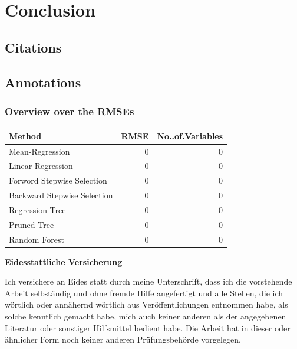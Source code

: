 \documentclass[11pt,]{article}
\begin{document}
\hypertarget{conclusion}{%
\section{Conclusion}\label{conclusion}}

\pagebreak

\hypertarget{citations}{%
\subsection{Citations}\label{citations}}

\pagebreak

\hypertarget{annotations}{%
\subsection{Annotations}\label{annotations}}

\hypertarget{overview-over-the-rmses}{%
\subsubsection{Overview over the RMSEs}\label{overview-over-the-rmses}}

\begin{tabular}{l|r|r}
\hline
Method & RMSE & No..of.Variables\\
\hline
Mean-Regression & 0 & 0\\
\hline
Linear Regression & 0 & 0\\
\hline
Forword Stepwise Selection & 0 & 0\\
\hline
Backward Stepwise Selection & 0 & 0\\
\hline
Regression Tree & 0 & 0\\
\hline
Pruned Tree & 0 & 0\\
\hline
Random Forest & 0 & 0\\
\hline
\end{tabular}
\renewcommand*{\mkbibnamefamily}[1]{\textbf{#1}}
\renewcommand*{\mkbibnamegiven}[1]{\textbf{#1}}
\renewcommand*{\mkbibnameprefix}[1]{\textbf{#1}}
\renewcommand*{\mkbibnamesuffix}[1]{\textbf{#1}}
\printbibliography[title=References]

\newpage
\textbf{Eidesstattliche Versicherung}

\bigskip

Ich versichere an Eides statt durch meine Unterschrift, dass ich die vorstehende Arbeit selbständig und ohne fremde Hilfe angefertigt und alle Stellen, die ich wörtlich oder annähernd wörtlich aus Veröffentlichungen entnommen habe, als solche kenntlich gemacht habe, mich auch keiner anderen als der angegebenen Literatur oder sonstiger Hilfsmittel bedient habe. Die Arbeit hat in dieser oder ähnlicher Form noch keiner anderen Prüfungsbehörde vorgelegen.

\vspace{1cm}
\rule{0pt}{2\baselineskip} %
\par\noindent{} \hfill\makebox[2.25in]{\hrulefill}%
\par\noindent\makebox[2.25in][l]{} \hfill{}%
\end{document}

